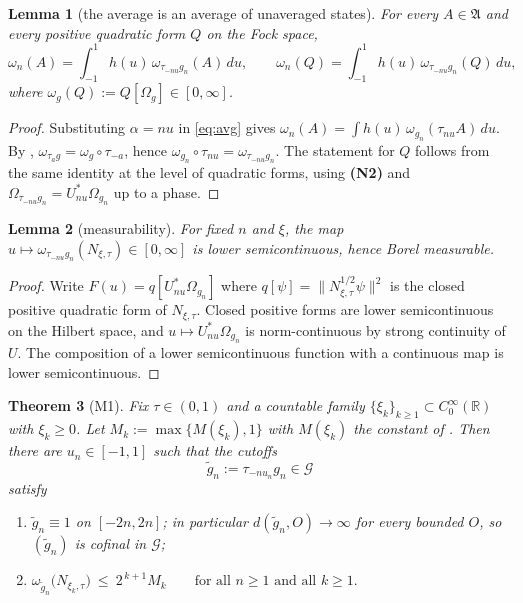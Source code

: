 \documentclass[11pt,a4paper]{article}
\theoremstyle{plain}
\newtheorem{theorem}{Theorem}[section]
\newtheorem{lemma}[theorem]{Lemma}
\theoremstyle{definition}
\newcommand{\A}{\mathfrak{A}}
\newcommand{\G}{\mathcal{G}}
\newcommand{\R}{\mathbb{R}}
\newcommand{\Om}{\Omega}
\begin{document}
\begin{lemma}[the average is an average of unaveraged states]\label{lem:rewrite}
For every $A\in\A$ and every positive quadratic form $Q$ on the Fock space,
\[
  \omega_n(A)=\int_{-1}^{1}h(u)\,\omega_{\tau_{-nu}g_n}(A)\,du,
  \qquad
  \omega_n(Q)=\int_{-1}^{1}h(u)\,\omega_{\tau_{-nu}g_n}(Q)\,du ,
\]
where $\omega_g(Q):=Q[\Om_g]\in[0,\infty]$.
\end{lemma}

\begin{proof}
Substituting $\alpha=nu$ in \eqref{eq:avg} gives
$\omega_n(A)=\int h(u)\,\omega_{g_n}(\tau_{nu}A)\,du$. By \cite[Lem.~3.2]{M0},
$\omega_{\tau_ag}=\omega_g\circ\tau_{-a}$, hence $\omega_{g_n}\circ\tau_{nu}=\omega_{\tau_{-nu}g_n}$.
The statement for $Q$ follows from the same identity at the level of quadratic forms, using
\textbf{(N2)} and $\Om_{\tau_{-nu}g_n}=U_{nu}^*\Om_{g_n}$ up to a phase.
\end{proof}

\begin{lemma}[measurability]\label{lem:meas}
For fixed $n$ and $\xi$, the map $u\mapsto \omega_{\tau_{-nu}g_n}(N_{\xi,\tau})\in[0,\infty]$ is
lower semicontinuous, hence Borel measurable.
\end{lemma}

\begin{proof}
Write $F(u)=q[U_{nu}^*\Om_{g_n}]$ where $q[\psi]=\|N_{\xi,\tau}^{1/2}\psi\|^2$ is the closed
positive quadratic form of $N_{\xi,\tau}$. Closed positive forms are lower semicontinuous on the
Hilbert space, and $u\mapsto U_{nu}^*\Om_{g_n}$ is norm-continuous by strong continuity of $U$.
The composition of a lower semicontinuous function with a continuous map is lower semicontinuous.
\end{proof}

\begin{theorem}[M1]\label{thm:main}
Fix $\tau\in(0,1)$ and a countable family $\{\xi_k\}_{k\ge1}\subset C_0^\infty(\R)$ with
$\xi_k\ge0$. Let $M_k:=\max\{M(\xi_k),1\}$ with $M(\xi_k)$ the constant of
\cite[Thm.~3.3.1(b)]{GJIII}. Then there are $u_n\in[-1,1]$ such that the cutoffs
\[
  \tilde g_n:=\tau_{-nu_n}g_n\in\G
\]
satisfy
\begin{enumerate}
\item[\rm(i)] $\tilde g_n\equiv1$ on $[-2n,2n]$; in particular $d(\tilde g_n,O)\to\infty$ for
      every bounded $O$, so $(\tilde g_n)$ is cofinal in $\G$;
\item[\rm(ii)] $\displaystyle \omega_{\tilde g_n}\bigl(N_{\xi_k,\tau}\bigr)\ \le\ 2^{\,k+1}M_k
      \qquad\text{for all }n\ge1\text{ and all }k\ge1 .$
\end{enumerate}
\end{theorem}
\end{document}
